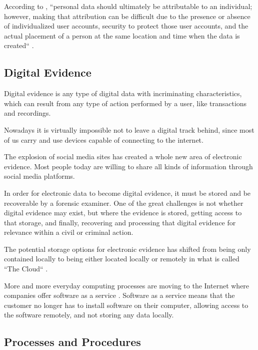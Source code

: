 According to , ``personal data should ultimately be attributable to an individual; however, making
that attribution can be difficult due to the presence or absence of individualized
user accounts, security to protect those user accounts, and the actual placement of a
person at the same location and time when the data is created`` \cite{daniels}.

\subsection{Digital Evidence}

Digital evidence is any type of digital data with incriminating characteristics,
which can result from any type of action performed by a user, like transactions and
recordings.

Nowadays it is virtually impossible not to leave a digital track behind, since most
of us carry and use devices capable of connecting to the internet.

The explosion of social media \cite{daniels} sites has created a whole new area of electronic
evidence. Most people today are willing to share all kinds of information through
social media platforms.

In order for electronic data to become digital evidence, it must be stored and be recoverable
by a forensic examiner. One of the great challenges is not whether digital
evidence may exist, but where the evidence is stored, getting access to that storage,
and finally, recovering and processing that digital evidence for relevance within
a civil or criminal action.

The potential storage options for electronic evidence has shifted from being only contained locally
to being either located locally or remotely in what is called ``The Cloud`` \cite{cloud}. 

More and more everyday computing processes are moving to the Internet
where companies offer software as a service \cite{saas}. Software as a service means that
the customer no longer has to install software on their computer, allowing access to the software remotely,
and not storing any data locally.


\subsection{Processes and Procedures}

